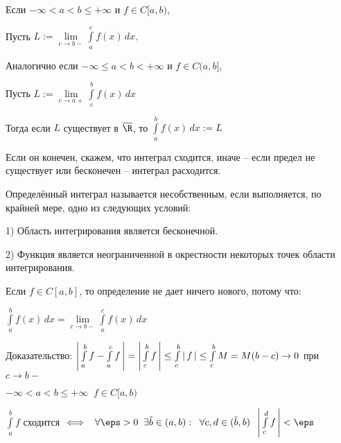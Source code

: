 
\begin{definition} \thmslashn 
	
	Если $-\infty < a < b \le +\infty$ и  $f \in C[a,b)$,
	 
	Пусть $L := \lim\limits_{c \to b-} \int\limits_a^c f(x) \, dx$.
	
	Аналогично если $-\infty \le a < b < +\infty$ и $f \in C(a,b]$,
	
	Пусть $L := \lim\limits_{c \to a+} \int\limits_c^b f(x) \, dx$
	
	
	Тогда если $L$ существует в $\overline{\R}$, то $\int\limits_a^b f(x)\,dx := L$
	
	Если он конечен, скажем, что интеграл сходится, иначе -- если предел не существует или бесконечен -- интеграл расходится.
	
	Определённый интеграл называется несобственным, если выполняется, по крайней мере, одно из следующих условий:
	
	1) Область интегрирования является бесконечной.
	
	2) Функция является неограниченной в окрестности некоторых точек области интегрирования.
	
\end{definition}

\begin{remark}\slashns
	
	Если $f \in C[a,b]$, то определение не дает ничего нового, потому что:
	
	$\int\limits_a^b f(x) \, dx = \lim\limits_{c \to b-} \int\limits_a^c f(x) \, dx$
	
	Доказательство: $\left|\,{\int\limits_a^b f - \int\limits_a^c f}\,\right| = \left|\,{\int\limits_c^b f}\,\right| \le \int\limits_c^b \left|\,{f}\,\right| \le \int\limits_c^b M = M(b-c) \to 0$ при $c \to b-$
	
\end{remark}

\begin{theorem}\slashns
	
	$-\infty < a < b \le +\infty \;\; f\in C[a,b)$
	
	$\int\limits_a^b f$ сходится $\iff \;\; \forall \eps > 0 \;\;  \exists \tilde{b} \in (a,b) : \;\; \forall c, d \in (\tilde{b}, b) \;\; \abs{\int\limits_c^d f} < \eps$ 
\end{theorem}

